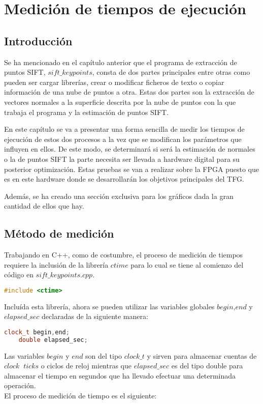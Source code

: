 \chapter{Medición de tiempos de ejecución}

\section{Introducción}
Se ha mencionado en el capítulo anterior que el programa de extracción de puntos SIFT, $sift\_keypoints$, consta de dos partes principales entre otras como pueden ser cargar librerías, crear o modificar ficheros de texto o copiar información de una nube de puntos a otra. Estas dos partes son la extracción de vectores normales a la superficie descrita por la nube de puntos con la que trabaja el programa y la estimación de puntos SIFT.


En este capítulo se va a presentar una forma sencilla de medir los tiempos de ejecución de estos dos procesos a la vez que se modifican los parámetros que influyen en ellos. De este modo, se determinará si será la estimación de normales o la de puntos SIFT la parte necesita ser llevada a hardware digital para su posterior optimización. Estas pruebas se van a realizar sobre la FPGA puesto que es en este hardware donde se desarrollarán los objetivos principales del TFG.

Además, se ha creado una sección exclusiva para los gráficos dada la gran cantidad de ellos que hay.


\section{Método de medición}
Trabajando en C++, como de costumbre, el proceso de medición de tiempos requiere la inclusión de la librería $ctime$ para lo cual se tiene al comienzo del código en $sift\_keypoints.cpp$.

\begin{lstlisting}[language=C++,breaklines]
	#include <ctime>
\end{lstlisting}

Incluída esta librería, ahora se pueden utilizar las variables globales $begin$,$end$ y $elapsed\_sec$ declaradas de la siguiente manera:

\begin{lstlisting}[language=C++,breaklines]
	clock_t begin,end;
	double elapsed_sec;
\end{lstlisting}

Las variables $begin$ y $end$ son del tipo $clock\_t$ y sirven para almacenar cuentas de $clock\;\; ticks$ o ciclos de reloj mientras que $elapsed\_sec$ es del tipo double para almacenar el tiempo en segundos que ha llevado efectuar una determinada operación.\\
El proceso de medición de tiempo es el siguiente: 

